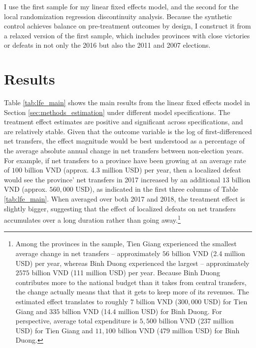 \documentclass[12pt]{article}
\newcommand{\1}{\mathbbm{1}}
\begin{document}
I use the first sample for my linear fixed effects model, and the second for the local randomization regression discontinuity analysis. Because the synthetic control achieves balance on pre-treatment outcomes by design, I construct it from a relaxed version of the first sample, which includes provinces with close victories or defeats in not only the 2016 but also the 2011 and 2007 elections.



\section{Results}
\label{sec:results}


Table \ref{tab:lfe_main} shows the main results from the linear fixed effects model in Section \ref{sec:methods_estimation} under different model specifications. The treatment effect estimates are positive and significant across specifications, and are relatively stable. Given that the outcome variable is the log of first-differenced net transfers, the effect magnitude would be best understood as a percentage of the average absolute annual change in net transfers between non-election years. For example, if net transfers to a province have been growing at an average rate of $100$ billion VND (approx. 4.3 million USD) per year, then a localized defeat would see the province' net transfers in 2017 increased by an additional $13$ billion VND (approx. $560,000$ USD), as indicated in the first three columns of Table \ref{tab:lfe_main}. When averaged over both 2017 and 2018, the treatment effect is slightly bigger, suggesting that the effect of localized defeats on net transfers accumulates over a long duration rather than going away.\footnote{Among the provinces in the sample, Tien Giang experienced the smallest average change in net transfers -- approximately $56$ billion VND (2.4 million USD) per year, whereas Binh Duong experienced the largest -- approximately $2575$ billion VND (111 million USD) per year. Because Binh Duong contributes more to the national budget than it takes from central transfers, the change actually means that that it gets to keep more of its revenues. The estimated effect translates to roughly $7$ billion VND ($300,000$ USD) for Tien Giang and $335$ billion VND (14.4 million USD) for Binh Duong. For perspective, average total expenditure is $5,500$ billion VND (237 million USD) for Tien Giang and $11,100$ billion VND (479 million USD) for Binh Duong.}
\end{document}
